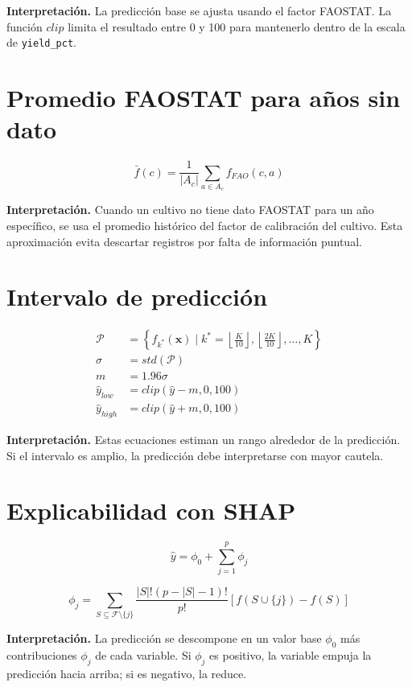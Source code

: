 \documentclass[12pt,letterpaper,oneside]{report}
\newcommand{\codigo}[1]{\texttt{#1}}
\begin{document}
\textbf{Interpretación.} La predicción base se ajusta usando el factor FAOSTAT. La función $clip$ limita el resultado entre 0 y 100 para mantenerlo dentro de la escala de \codigo{yield\_pct}.

\section{Promedio FAOSTAT para años sin dato}
\begin{equation}
\bar{f}(c)=\frac{1}{|A_c|}\sum_{a\in A_c}f_{FAO}(c,a)
\end{equation}

\textbf{Interpretación.} Cuando un cultivo no tiene dato FAOSTAT para un año específico, se usa el promedio histórico del factor de calibración del cultivo. Esta aproximación evita descartar registros por falta de información puntual.

\section{Intervalo de predicción}
\begin{align}
\mathcal{P} &= \left\{ f_{k^*}(\mathbf{x})\mid k^*=\left\lfloor\frac{K}{10}\right\rfloor,\left\lfloor\frac{2K}{10}\right\rfloor,\ldots,K\right\} \\
\sigma &= std(\mathcal{P}) \\
m &= 1.96\sigma \\
\hat{y}_{low} &= clip(\hat{y}-m,0,100) \\
\hat{y}_{high} &= clip(\hat{y}+m,0,100)
\end{align}

\textbf{Interpretación.} Estas ecuaciones estiman un rango alrededor de la predicción. Si el intervalo es amplio, la predicción debe interpretarse con mayor cautela.

\section{Explicabilidad con SHAP}
\begin{equation}
\hat{y}=\phi_0+\sum_{j=1}^{p}\phi_j
\end{equation}

\begin{equation}
\phi_j=\sum_{S\subseteq \mathcal{F}\setminus\{j\}}\frac{|S|!(p-|S|-1)!}{p!}\left[f(S\cup\{j\})-f(S)\right]
\end{equation}

\textbf{Interpretación.} La predicción se descompone en un valor base $\phi_0$ más contribuciones $\phi_j$ de cada variable. Si $\phi_j$ es positivo, la variable empuja la predicción hacia arriba; si es negativo, la reduce.
\end{document}

